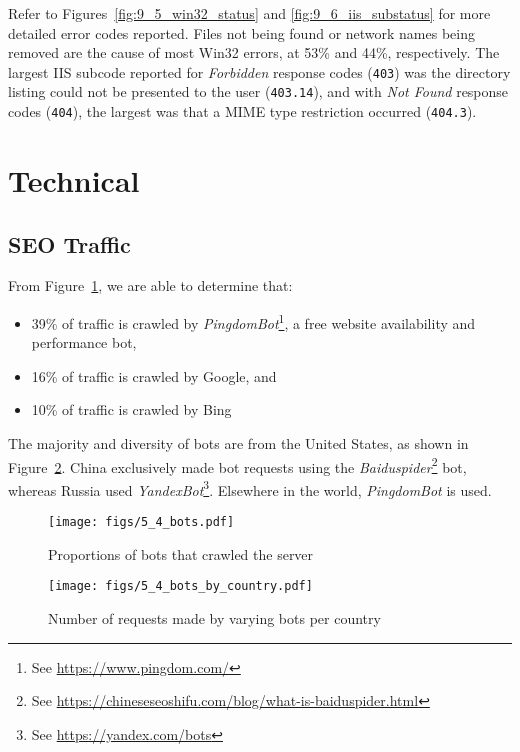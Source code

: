 \documentclass[12pt,titlepage]{article}
\begin{document}
Refer to Figures~\ref{fig:9_5_win32_status} and \ref{fig:9_6_iis_substatus} for more detailed error codes reported. Files not being found or network names being removed are the cause of most Win32 errors, at 53\% and 44\%, respectively.  The largest IIS subcode reported for \textit{Forbidden} response codes (\texttt{403}) was the directory listing could not be presented to the user (\texttt{403.14}), and with \textit{Not Found} response codes (\texttt{404}), the largest was that a MIME type restriction occurred (\texttt{404.3}).

\newpage
\clearpage
\section{Technical}

\subsection{SEO Traffic}
\label{ssub:seo}

From Figure~\ref{fig:5_4_bots}, we are able to determine that:

\begin{itemize}
  \item 39\% of traffic is crawled by \textit{PingdomBot}\footnote{See \url{https://www.pingdom.com/}}, a free website availability and performance bot,
  \item 16\% of traffic is crawled by Google, and
  \item 10\% of traffic is crawled by Bing
\end{itemize}

\noindent
The majority and diversity of bots are from the United States, as shown in Figure~\ref{fig:5_4_bots_by_country}. China exclusively made bot requests using the \textit{Baiduspider}\footnote{See \url{https://chineseseoshifu.com/blog/what-is-baiduspider.html}} bot, whereas Russia used \textit{YandexBot}\footnote{See \url{https://yandex.com/bots}}. Elsewhere in the world, \textit{PingdomBot} is used.

\begin{figure}[p]
  \centering
  \texttt{[image: figs/5\_4\_bots.pdf]}
  \caption{Proportions of bots that crawled the server}
  \label{fig:5_4_bots}
\end{figure}

\begin{figure}[p]
  \centering
  \texttt{[image: figs/5\_4\_bots\_by\_country.pdf]}
  \caption{Number of requests made by varying bots per country}
  \label{fig:5_4_bots_by_country}
\end{figure}
\end{document}
